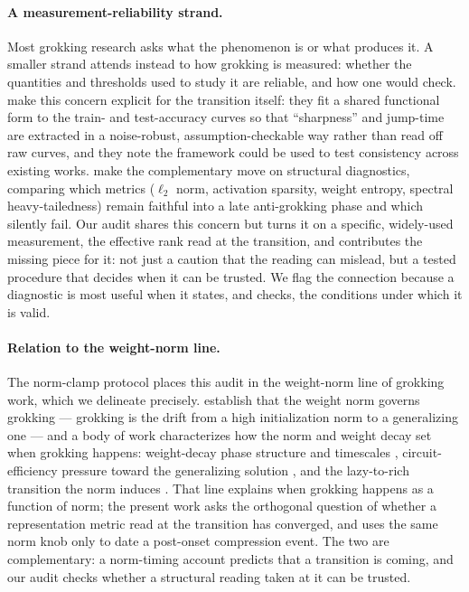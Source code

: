 \documentclass[11pt]{article}
\begin{document}
\paragraph{A measurement-reliability strand.} Most grokking research asks what the phenomenon is or what
produces it. A smaller strand attends instead to how grokking is measured: whether the
quantities and thresholds used to study it are reliable, and how one would check. \citet{miller2024sharpness}
make this concern explicit for the transition itself: they fit a shared functional form to the
train- and test-accuracy curves so that ``sharpness'' and jump-time are extracted in a noise-robust,
assumption-checkable way rather than read off raw curves, and they note the framework could be used to
test consistency across existing works. \citet{prakash2026antigrokking} make the complementary move on
structural diagnostics, comparing which metrics ($\ell_2$ norm, activation sparsity, weight entropy,
spectral heavy-tailedness) remain faithful into a late anti-grokking phase and which silently fail. Our
audit shares this concern but turns it on a specific, widely-used measurement, the effective rank read
at the transition, and contributes the missing piece for it: not just a caution that the reading can
mislead, but a tested procedure that decides when it can be trusted. We flag the connection because a
diagnostic is most useful when it states, and checks, the conditions under which it is valid.

\paragraph{Relation to the weight-norm line.} The norm-clamp protocol places this audit in the
weight-norm line of grokking work, which we delineate precisely. \citet{omnigrok} establish that the
weight norm governs grokking --- grokking is the drift from a high initialization norm to a generalizing
one --- and a body of work characterizes how the norm and weight decay set when grokking happens:
weight-decay phase structure and timescales \citep{xu2026multitask,verma2026weightdecay}, circuit-efficiency
pressure toward the generalizing solution \citep{varma2023circuit}, and the lazy-to-rich transition the
norm induces \citep{kumar2024lazy}. That line explains when grokking happens as a function of norm;
the present work asks the orthogonal question of whether a representation metric read at the
transition has converged, and uses the same norm knob only to date a post-onset compression event. The two
are complementary: a norm-timing account predicts that a transition is coming, and our audit checks whether
a structural reading taken at it can be trusted.
\end{document}
